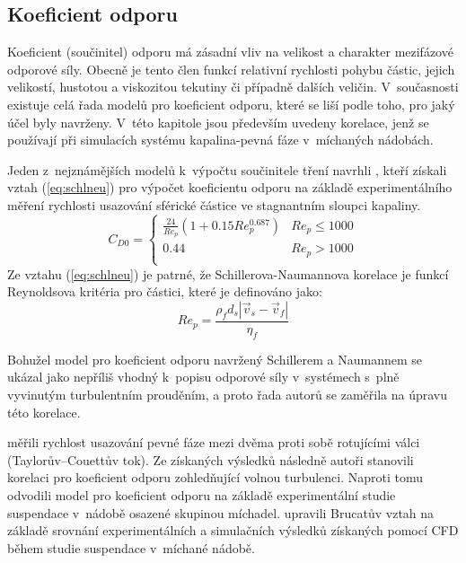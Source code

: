 \subsection{Koeficient odporu}
\label{kap:cd}
Koeficient (součinitel) odporu má zásadní vliv na velikost a charakter mezifázové odporové síly. Obecně je tento člen funkcí relativní rychlosti pohybu částic, jejich velikostí, hustotou a viskozitou tekutiny či případně dalších veličin. V~současnosti existuje celá řada modelů pro koeficient odporu, které se liší podle toho, pro jaký účel byly navrženy. V~této kapitole jsou především uvedeny korelace, jenž se používají při simulacích systému kapalina-pevná fáze v~míchaných nádobách. 

Jeden z~nejznámějších modelů k~výpočtu součinitele tření navrhli \citet{schi32}, kteří získali vztah (\ref{eq:schlneu}) pro výpočet koeficientu odporu na základě experimentálního měření rychlosti usazování sférické částice ve stagnantním sloupci kapaliny.    
\begin{equation}
	\label{eq:schlneu}
  C_{D0} = \left\{ \begin{array}{ll}
  \frac{24}{Re_{p}}  \left( 1 + \num{0.15}Re_{p}^{\num{0.687}} \right) & Re_{p} \le 1000\\
  \num{0.44} & Re_{p} > 1000\\
  \end{array} \right.
\end{equation}
\noindent Ze vztahu (\ref{eq:schlneu}) je patrné, že Schillerova-Naumannova korelace je funkcí Reynoldsova kritéria pro částici, které je definováno jako:
\begin{equation}
	Re_{p}= \frac{\rho_{f}d_{s}\left|\vec{v}_{s} - \vec{v}_{f}\right|}{\eta_{f}}
	\label{eq:reyp}
\end{equation}

Bohužel model pro koeficient odporu navržený Schillerem a Naumannem se ukázal jako nepříliš vhodný k~popisu odporové síly v~systémech s~plně vyvinutým turbulentním prouděním, a proto řada autorů se zaměřila na úpravu této korelace.

\citet{bru98} měřili rychlost usazování pevné fáze mezi dvěma proti sobě rotujícími válci (Taylorův–Couettův tok). Ze získaných výsledků následně autoři stanovili korelaci pro koeficient odporu zohledňující volnou turbulenci. Naproti tomu \citet{pin01} odvodili model pro koeficient odporu na základě experimentální studie suspendace v~nádobě osazené skupinou míchadel. \citet{kho06} upravili Brucatův vztah na základě srovnání experimentálních a simulačních výsledků získaných pomocí CFD během studie suspendace v~míchané nádobě. 


